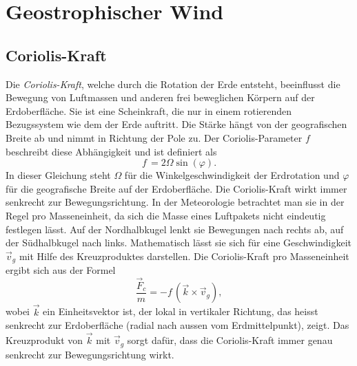 %
%
%
%
\section{Geostrophischer Wind
\label{geostrophisch:section:geoWind}}


\subsection{Coriolis-Kraft
\label{geostrophisch:subsection:coriolis}}
Die \emph{Coriolis-Kraft}, welche durch die Rotation der Erde entsteht, beeinflusst die Bewegung von Luftmassen und anderen frei beweglichen Körpern auf der Erdoberfläche. Sie ist eine Scheinkraft, die nur in einem rotierenden Bezugssystem wie dem der Erde auftritt. Die Stärke hängt von der geografischen Breite ab und nimmt in Richtung der Pole zu.
%
Der Coriolis-Parameter $f$ beschreibt diese Abhängigkeit und ist definiert als 
%
\begin{equation}
f\, 
= 
2\Omega\sin(\varphi)
\label{geostrophisch:equation1}.
\end{equation}
In dieser Gleichung steht $\Omega$ für die Winkelgeschwindigkeit der Erdrotation und $\varphi$ für die geografische Breite auf der Erdoberfläche.
Die Coriolis-Kraft wirkt immer senkrecht zur Bewegungsrichtung. In der Meteorologie betrachtet man sie in der Regel pro Masseneinheit, da sich die Masse eines Luftpakets nicht eindeutig festlegen lässt. Auf der Nordhalbkugel lenkt sie Bewegungen nach rechts ab, auf der Südhalbkugel nach links. Mathematisch lässt sie sich für eine Geschwindigkeit $\vec{v}_g $ mit Hilfe des Kreuzproduktes darstellen. 
%
Die Coriolis-Kraft pro Masseneinheit ergibt sich aus der Formel
\begin{equation}
\frac{\vec{F}_c} {m}
= 
-f\, (\vec{k} \times \vec{v}_g) 
\label{geostrophisch:equation2},
\end{equation}
wobei $\vec{k}$ ein Einheitsvektor ist, der lokal in vertikaler Richtung, das heisst senkrecht zur Erdoberfläche (radial nach aussen vom Erdmittelpunkt), zeigt.
Das Kreuzprodukt von $\vec{k}$ mit  $\vec{v}_g $ sorgt dafür, dass die Coriolis-Kraft immer genau senkrecht zur Bewegungsrichtung wirkt.

